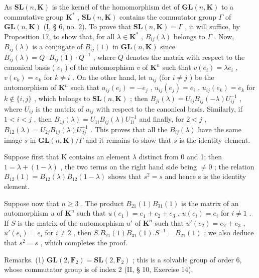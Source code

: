 As \(\mathbf{SL}(n, \mathbf{K})\) is the kernel of the homomorphism det of \(\mathbf{GL}(n, \mathbf{K})\) to a commutative group \(\mathbf{K}^*\) , \(\mathbf{SL}(n, \mathbf{K})\) contains the commutator group \(\Gamma\) of \(\mathbf{GL}(n, \mathbf{K})\) (I, § 6, no. 2). To prove that \(\mathbf{SL}(n, \mathbf{K}) = \Gamma\) , it will suffice, by Proposition 17, to show that, for all \(\lambda \in \mathbf{K}^*\) , \(B_{ij}(\lambda)\) belongs to \(\Gamma\) . Now, \(B_{ij}(\lambda)\) is a conjugate of \(B_{ij}(1)\) in \(\mathbf{GL}(n, \mathbf{K})\) since \(B_{ij}(\lambda) = Q \cdot B_{ij}(1) \cdot Q^{-1}\) , where \(Q\) denotes the matrix with respect to the canonical basis ( \(e_i\) ) of the automorphism \(v\) of \(\mathbf{K}^n\) such that \(v(e_i) = \lambda e_i\) , \(v(e_k) = e_k\) for \(k \neq i\) . On the other hand, let \(u_{ij}\) (for \(i \neq j\) ) be the automorphism of \(\mathbf{K}^n\) such that \(u_{ij}(e_i) = -e_j\) , \(u_{ij}(e_j) = e_i\) , \(u_{ij}(e_k) = e_k\) for \(k \notin \{i, j\}\) , which belongs to \(\mathbf{SL}(n, \mathbf{K})\) ; then \(B_{ji}(\lambda) = U_{ij}B_{ij}(-\lambda)U_{ij}^{-1}\) , where \(U_{ij}\) is the matrix of \(u_{ij}\) with respect to the canonical basis. Similarly, if \(1 < i < j\) , then \(B_{1j}(\lambda) = U_{1i}B_{ij}(\lambda)U_{1i}^{-1}\) and finally, for \(2 < j\) , \(B_{12}(\lambda) = U_{2j}B_{1j}(\lambda)U_{2j}^{-1}\) . This proves that all the \(B_{ij}(\lambda)\) have the same image \(s\) in \(\mathbf{GL}(n, \mathbf{K}) / \Gamma\) and it remains to show that \(s\) is the identity element.

Suppose first that K contains an element \(\lambda\) distinct from 0 and 1; then \(1 = \lambda + (1 - \lambda)\) , the two terms on the right hand side being \(\neq 0\) ; the relation \(B_{12}(1) = B_{12}(\lambda)B_{12}(1 - \lambda)\) shows that \(s^{2} = s\) and hence s is the identity element.

Suppose now that \(n \geqslant 3\) . The product \(B_{21}(1)B_{31}(1)\) is the matrix of an automorphism \(u\) of \(\mathbf{K}^n\) such that \(u(e_1) = e_1 + e_2 + e_3\) , \(u(e_i) = e_i\) for \(i \neq 1\) . If \(S\) is the matrix of the automorphism \(u'\) of \(\mathbf{K}^n\) such that \(u'(e_2) = e_2 + e_3\) , \(u'(e_i) = e_i\) for \(i \neq 2\) , then \(S.B_{21}(1)B_{31}(1).S^{-1} = B_{21}(1)\) ; we also deduce that \(s^2 = s\) , which completes the proof.

Remarks. (1) \(\mathbf{GL}(2, \mathbf{F}_2) = \mathbf{SL}(2, \mathbf{F}_2)\) ; this is a solvable group of order 6, whose commutator group is of index 2 (II, § 10, Exercise 14).

